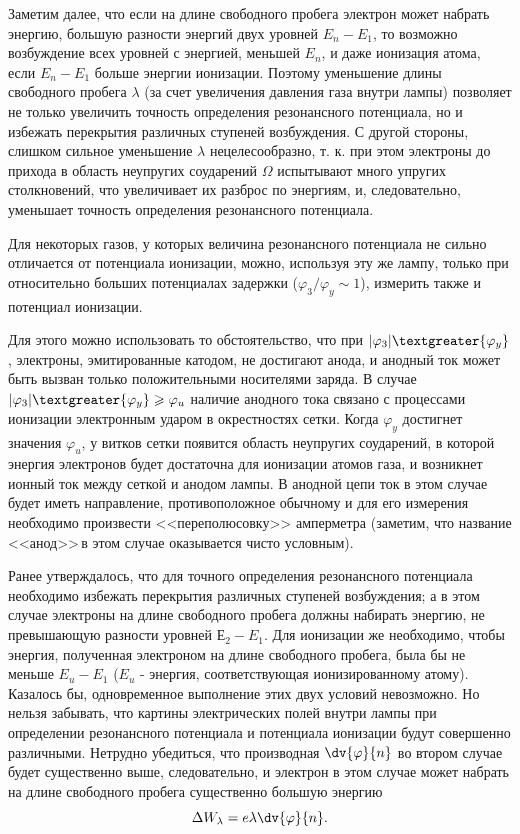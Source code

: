 Заметим далее, что если на длине свободного пробега электрон может набрать энергию, большую разности энергий двух уровней $E_n-E_1$, то возможно возбуждение всех уровней с
энергией, меньшей $E_n$, и даже ионизация атома, если $E_n-E_1$ больше энергии ионизации. Поэтому уменьшение длины свободного пробега $\lambda$ (за счет увеличения давления газа внутри лампы) позволяет не только увеличить точность определения резонансного потенциала, но и избежать перекрытия различных ступеней возбуждения. С другой стороны, слишком сильное уменьшение $\lambda$ нецелесообразно, т. к. при этом электроны до прихода в область неупругих соударений $\Omega$ испытывают много упругих столкновений, что увеличивает их разброс по энергиям, и, следовательно, уменьшает точность определения резонансного потенциала.

Для некоторых газов, у которых величина резонансного потенциала не сильно отличается от потенциала ионизации, можно, используя эту же лампу, только при относительно больших потенциалах задержки ($\varphi_{3} /\varphi_{y} \sim1$), измерить также и потенциал ионизации.

Для этого можно использовать то обстоятельство, что при $|\varphi_{3}|\textgreater{\varphi_{y}}$, электроны, эмитированные катодом, не достигают анода, и анодный ток может быть вызван только положительными носителями заряда. В случае $|\varphi_{3}|\textgreater{\varphi_{y}}\geqslant{\varphi_{u}}$ наличие анодного тока связано с процессами ионизации электронным ударом в окрестностях сетки. Когда $\varphi_{y}$ достигнет значения $\varphi_{u}$, у витков сетки появится область неупругих соударений, в которой энергия электронов будет достаточна для ионизации атомов газа, и возникнет ионный ток между сеткой и анодом лампы. В анодной цепи ток в этом случае будет иметь направление, противоположное обычному и для его измерения необходимо произвести <<переполюсовку>> амперметра (заметим, что название <<анод>>\,в этом случае оказывается чисто условным).

Ранее утверждалось, что для точного определения резонансного потенциала необходимо избежать перекрытия различных ступеней возбуждения; а в этом случае электроны на длине свободного пробега должны набирать энергию, не превышающую разности уровней $\text{Е}_{2}-E_{1}$. Для ионизации же необходимо, чтобы энергия, полученная электроном на длине свободного пробега, была бы не меньше $E_{u}-E_1$ ($E_{u}$ - энергия, соответствующая ионизированному атому). Казалось бы, одновременное выполнение этих двух условий невозможно. Но нельзя забывать, что картины электрических полей внутри лампы при определении резонансного потенциала и потенциала ионизации будут совершенно различными. Нетрудно убедиться, что производная $\displaystyle\dv{\varphi}{n}$ во втором случае будет существенно выше, следовательно, и электрон в этом случае может набрать на длине свободного пробега существенно большую энергию $$\Delta W_{\lambda}=e\lambda \displaystyle\dv{\varphi}{n}.$$

